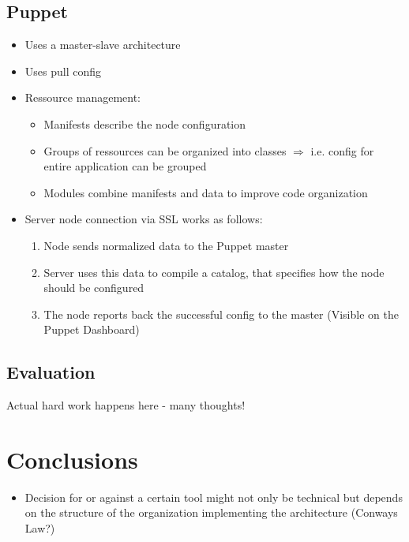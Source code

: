 \subsection{Puppet}
	\begin{itemize}
		\item Uses a master-slave architecture
		\item Uses pull config
		\item Ressource management:
		\begin{itemize}
			\item Manifests describe the node configuration
			\item Groups of ressources can be organized into classes $\Rightarrow$ i.e. config for entire application can be grouped
			\item Modules combine manifests and data to improve code organization
		\end{itemize}
		\item Server node connection via SSL works as follows:
		\begin{enumerate}
			\item Node sends normalized data to the Puppet master
			\item Server uses this data to compile a catalog, that specifies how the node should be configured
			\item The node reports back the successful config to the master (Visible on the Puppet Dashboard)
		\end{enumerate}
	\end{itemize}

\subsection{Evaluation}

Actual hard work happens here - many thoughts!


\section{Conclusions}

\begin{itemize}
\item Decision for or against a certain tool might not only be technical but depends on the structure of the organization implementing the architecture (Conways Law?)
\end{itemize}

